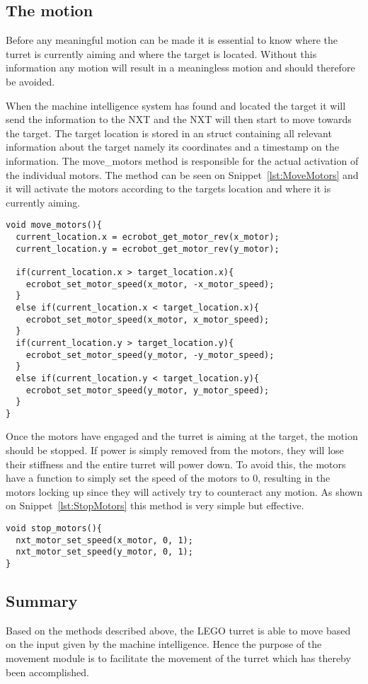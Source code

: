 \subsection{The motion}
Before any meaningful motion can be made it is essential to know where the turret is currently aiming and where the target is located.
Without this information any motion will result in a meaningless motion and should therefore be avoided.

When the machine intelligence system has found and located the target it will send the information to the NXT and the NXT will then start to move towards the target.
The target location is stored in an struct containing all relevant information about the target namely its coordinates and a timestamp on the information.
The move\_motors method is responsible for the actual activation of the individual motors.
The method can be seen on Snippet~\ref{lst:MoveMotors} and it will activate the motors according to the targets location and where it is currently aiming.
\begin{lstlisting}[language=CSharp,caption={move\_motors method from movement.c},label={lst:MoveMotors}]
void move_motors(){
  current_location.x = ecrobot_get_motor_rev(x_motor);
  current_location.y = ecrobot_get_motor_rev(y_motor);

  if(current_location.x > target_location.x){
    ecrobot_set_motor_speed(x_motor, -x_motor_speed);
  }
  else if(current_location.x < target_location.x){
    ecrobot_set_motor_speed(x_motor, x_motor_speed);
  }
  if(current_location.y > target_location.y){
    ecrobot_set_motor_speed(y_motor, -y_motor_speed);
  }
  else if(current_location.y < target_location.y){
    ecrobot_set_motor_speed(y_motor, y_motor_speed);
  }
}
\end{lstlisting}
Once the motors have engaged and the turret is aiming at the target, the motion should be stopped.
If power is simply removed from the motors, they will lose their stiffness and the entire turret will power down.
To avoid this, the motors have a function to simply set the speed of the motors to $0$, resulting in the motors locking up since they will actively try to counteract any motion.
As shown on Snippet~\ref{lst:StopMotors} this method is very simple but effective.
\begin{lstlisting}[language=CSharp,label={lst:StopMotors},caption={stop\_motors method from movement.c}]
void stop_motors(){
  nxt_motor_set_speed(x_motor, 0, 1);
  nxt_motor_set_speed(y_motor, 0, 1);
}
\end{lstlisting}

\subsection{Summary}
Based on the methods described above, the LEGO turret is able to move based on the input given by the machine intelligence.
Hence the purpose of the movement module is to facilitate the movement of the turret which has thereby been accomplished.

